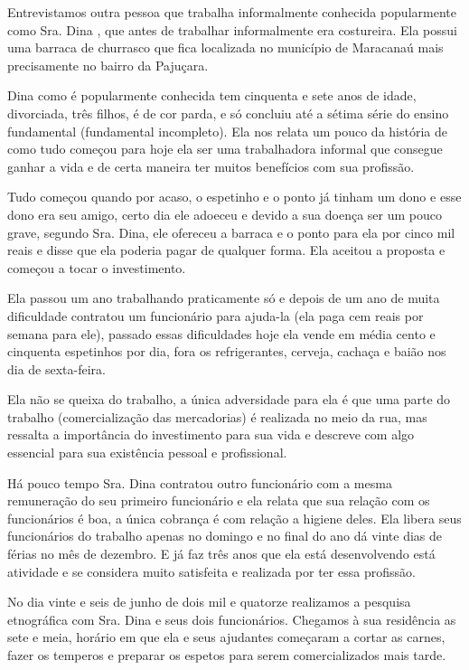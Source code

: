 Entrevistamos outra pessoa que trabalha informalmente conhecida popularmente como Sra. Dina , que antes de trabalhar informalmente era costureira. Ela possui uma barraca de churrasco que fica localizada no município de Maracanaú mais precisamente no bairro da Pajuçara. 

Dina como é popularmente conhecida tem cinquenta e sete anos de idade, divorciada, três filhos, é de cor parda, e só concluiu até a sétima série do ensino fundamental (fundamental incompleto). Ela nos relata um pouco da história de como tudo começou para hoje ela ser uma trabalhadora informal que consegue ganhar a vida e de certa maneira ter muitos benefícios com sua profissão. 

Tudo começou quando por acaso, o espetinho e o ponto já tinham um dono e esse dono era seu amigo, certo dia ele adoeceu e devido a sua doença ser um pouco grave, segundo Sra. Dina, ele ofereceu a barraca e o ponto para ela por cinco mil reais e disse que ela poderia pagar de qualquer forma. Ela aceitou a proposta e começou a tocar o investimento.

Ela passou um ano trabalhando praticamente só e depois de um ano de muita dificuldade contratou um funcionário para ajuda-la (ela paga cem reais por semana para ele), passado essas dificuldades hoje ela vende em média cento e cinquenta espetinhos por dia, fora os refrigerantes, cerveja, cachaça e baião nos dia de sexta-feira.

Ela não se queixa do trabalho, a única adversidade para ela é que uma parte do trabalho (comercialização das mercadorias) é realizada no meio da rua, mas ressalta a importância do investimento para sua vida e descreve com algo essencial para sua existência pessoal e profissional. 

Há pouco tempo Sra. Dina contratou outro funcionário com a mesma remuneração do seu primeiro funcionário e ela relata que sua relação com os funcionários é boa, a única cobrança é com relação a higiene deles. Ela libera seus funcionários do trabalho apenas no domingo e no final do ano dá vinte dias de férias no mês de dezembro. E já faz três anos que ela está desenvolvendo está atividade e se considera muito satisfeita e realizada por ter essa profissão.

No dia vinte e seis de junho de dois mil e quatorze realizamos a pesquisa etnográfica com Sra. Dina e seus dois funcionários. Chegamos à sua residência as sete e meia, horário em que ela e seus ajudantes começaram a cortar as carnes, fazer os temperos e preparar os espetos para serem comercializados mais tarde.

